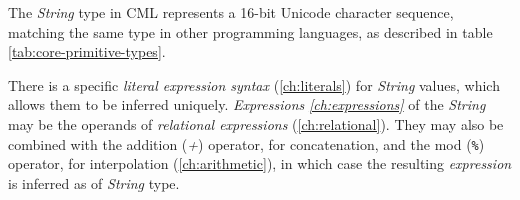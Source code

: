 The \emph{String} type in CML represents a 16-bit Unicode character sequence,
matching the same type in other programming languages,
as described in table \ref{tab:core-primitive-types}.

There is a specific \emph{literal expression syntax} (\ref{ch:literals})
for \emph{String} values,
which allows them to be inferred uniquely.
\emph{Expressions} \emph{\ref{ch:expressions}} of the \emph{String}
may be the operands of \emph{relational expressions} (\ref{ch:relational}).
They may also be combined with the addition (\emph{+}) operator, for concatenation,
and the mod (\verb|%|) operator, for interpolation (\ref{ch:arithmetic}),
in which case the resulting \emph{expression} is inferred as of \emph{String} type.
